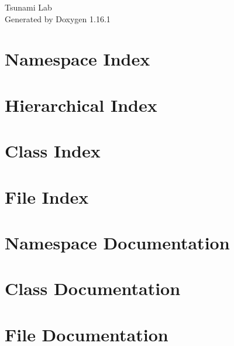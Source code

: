 \documentclass[twoside]{book}
\newcommand{\+}{\discretionary{\mbox{\scriptsize$\hookleftarrow$}}{}{}}
\newcommand{\clearemptydoublepage}{%
    \newpage{\pagestyle{empty}\cleardoublepage}%
  }
\begin{document}
  \raggedbottom
    \hypersetup{pageanchor=false,
                bookmarksnumbered=true,
                pdfencoding=unicode
               }
  \begin{titlepage}
  \vspace*{7cm}
  \begin{center}%
  {\Large Tsunami Lab}\\
  \vspace*{1cm}
  {\large Generated by Doxygen 1.16.1}\\
  \end{center}
  \end{titlepage}
  \clearemptydoublepage
  \tableofcontents
  \clearemptydoublepage
  \hypersetup{pageanchor=true}
\chapter{Namespace Index}

\chapter{Hierarchical Index}

\chapter{Class Index}

\chapter{File Index}

\chapter{Namespace Documentation}

\chapter{Class Documentation}






\chapter{File Documentation}







  \backmatter
  \newpage
  \clearemptydoublepage
  \printindex
\end{document}

